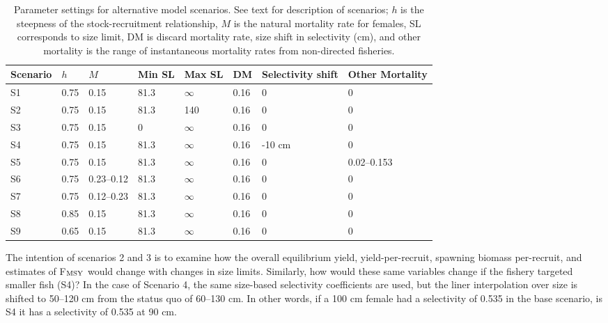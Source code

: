 \begin{table}[!tbh]
	\caption[]{Parameter settings for alternative model scenarios.  See text for description of scenarios; $h$ is the steepness of the stock-recruitment relationship, $M$ is the natural mortality rate for females, SL corresponds to size limit, DM is discard mortality rate, size shift in selectivity (cm), and other mortality is the range of instantaneous mortality rates from non-directed fisheries.}
	\label{table:Scenarios}
	\begin{center}
	\begin{tabular}{lll lll ll}
		\hline
		Scenario & $h$ & $M$        & Min  SL & Max SL     & DM   &Selectivity shift & Other Mortality  \\
		\hline                                
		S1       &0.75 & 0.15       & 81.3    & $\infty$   & 0.16 & 0                & 0                \\
		S2       &0.75 & 0.15       & 81.3    & 140        & 0.16 & 0                & 0                \\
		S3       &0.75 & 0.15       & 0       & $\infty$   & 0.16 & 0                & 0                \\
		S4       &0.75 & 0.15       & 81.3    & $\infty$   & 0.16 & -10 cm           & 0                \\
		S5       &0.75 & 0.15       & 81.3    & $\infty$   & 0.16 & 0                & 0.02--0.153      \\
		S6       &0.75 & 0.23--0.12 & 81.3    & $\infty$   & 0.16 & 0                & 0                \\
		S7       &0.75 & 0.12--0.23 & 81.3    & $\infty$   & 0.16 & 0                & 0                \\
		S8       &0.85 & 0.15       & 81.3    & $\infty$   & 0.16 & 0                & 0                \\
		S9       &0.65 & 0.15       & 81.3    & $\infty$   & 0.16 & 0                & 0                \\
		\hline
	\end{tabular}
	\end{center}
\end{table}

The intention of scenarios 2 and 3 is to examine how the overall equilibrium yield, yield-per-recruit, spawning biomass per-recruit, and estimates of F$_{\rm{MSY}}$ would change with changes in size limits.  Similarly, how would these same variables change if the fishery targeted smaller fish (S4)?  In the case of Scenario 4, the same size-based selectivity coefficients are used, but the liner interpolation over size is shifted to 50--120 cm from the status quo of 60--130 cm.  In other words, if a 100 cm female had a selectivity of 0.535 in the base scenario, is S4 it has a selectivity of 0.535 at 90 cm.  

